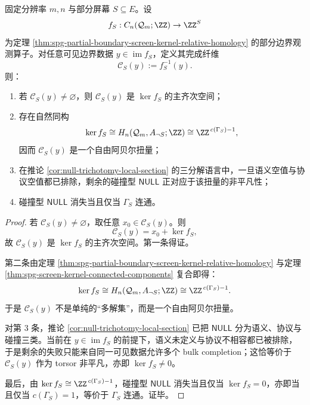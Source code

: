 \begin{theorem}\label{thm:conclusion-collision-null-topological-torsor}
固定分辨率 \(m,n\) 与部分屏幕 \(S\subseteq E\)。设
\[
f_S:C_n(\mathcal Q_m;\ZZ)\to \ZZ^S
\]
为定理 \ref{thm:spg-partial-boundary-screen-kernel-relative-homology} 的部分边界观测算子。对任意可见边界数据 \(y\in\operatorname{im}f_S\)，定义其完成纤维
\[
\mathcal C_S(y):=f_S^{-1}(y).
\]
则：
\begin{enumerate}
  \item 若 \(\mathcal C_S(y)\neq\varnothing\)，则 \(\mathcal C_S(y)\) 是 \(\ker f_S\) 的主齐次空间；
  \item 存在自然同构
        \[
        \ker f_S\cong H_n(\mathcal Q_m,A_{\neg S};\ZZ)\cong \ZZ^{\,c(\Gamma_S)-1},
        \]
        因而 \(\mathcal C_S(y)\) 是一个自由阿贝尔扭量；
  \item 在推论 \ref{cor:null-trichotomy-local-section} 的三分解语言中，一旦语义空值与协议空值都已排除，剩余的碰撞型 \(\mathsf{NULL}\) 正对应于该扭量的非平凡性；
  \item 碰撞型 \(\mathsf{NULL}\) 消失当且仅当 \(\Gamma_S\) 连通。
\end{enumerate}
\end{theorem}

\begin{proof}
若 \(\mathcal C_S(y)\neq\varnothing\)，取任意 \(x_0\in\mathcal C_S(y)\)。则
\[
\mathcal C_S(y)=x_0+\ker f_S,
\]
故 \(\mathcal C_S(y)\) 是 \(\ker f_S\) 的主齐次空间。第一条得证。

第二条由定理 \ref{thm:spg-partial-boundary-screen-kernel-relative-homology} 与定理 \ref{thm:spg-screen-kernel-connected-components} 复合即得：
\[
\ker f_S\cong H_n(\mathcal Q_m,A_{\neg S};\ZZ)\cong \ZZ^{\,c(\Gamma_S)-1}.
\]
于是 \(\mathcal C_S(y)\) 不是单纯的“多解集”，而是一个自由阿贝尔扭量。

对第 \(3\) 条，推论 \ref{cor:null-trichotomy-local-section} 已把 \(\mathsf{NULL}\) 分为语义、协议与碰撞三类。当前在 \(y\in\operatorname{im}f_S\) 的前提下，语义未定义与协议不相容都已被排除，于是剩余的失败只能来自同一可见数据允许多个 bulk completion；这恰等价于 \(\mathcal C_S(y)\) 作为 torsor 非平凡，亦即 \(\ker f_S\neq 0\)。

最后，由 \(\ker f_S\cong \ZZ^{\,c(\Gamma_S)-1}\)，碰撞型 \(\mathsf{NULL}\) 消失当且仅当 \(\ker f_S=0\)，亦即当且仅当 \(c(\Gamma_S)=1\)，等价于 \(\Gamma_S\) 连通。证毕。
\end{proof}

